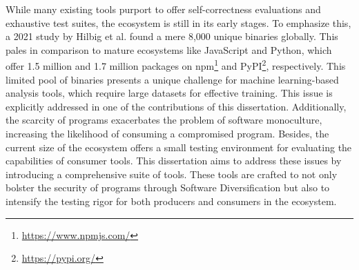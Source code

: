 While many existing tools purport to offer self-correctness evaluations and exhaustive test suites, the \Wasm ecosystem is still in its early stages. 
To emphasize this, a 2021 study by Hilbig et al.\cite{Hilbig2021AnES} found a mere 8,000 unique \Wasm binaries globally. 
This pales in comparison to mature ecosystems like JavaScript and Python, which offer 1.5 million and 1.7 million packages on npm\footnote{\url{https://www.npmjs.com/}} and PyPI\footnote{\url{https://pypi.org/}}, respectively.
This limited pool of \Wasm binaries presents a unique challenge for machine learning-based analysis tools, which require large datasets for effective training. 
This issue is explicitly addressed in one of the contributions of this dissertation\cite{EVASION}.
Additionally, the scarcity of \Wasm programs exacerbates the problem of software monoculture, increasing the likelihood of consuming a compromised \Wasm program\cite{YourCitationHere}.
Besides, the current size of the \Wasm ecosystem offers a small testing environment for evaluating the capabilities of consumer tools.
This dissertation aims to address these issues by introducing a comprehensive suite of tools. 
These tools are crafted to not only bolster the security of \Wasm programs through Software Diversification but also to intensify the testing rigor for both producers and consumers in the ecosystem.
